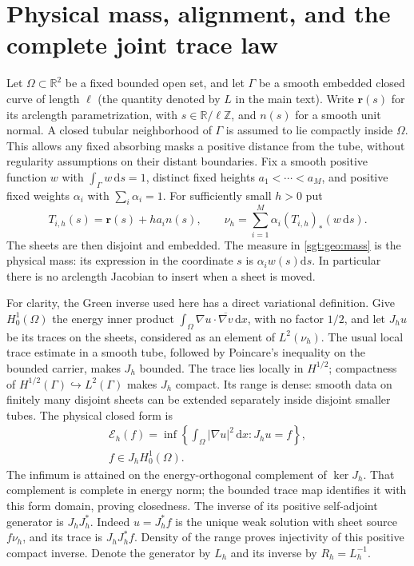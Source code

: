 \documentclass[aps,pra,reprint,superscriptaddress,longbibliography]{revtex4-2}
\newcommand{\dd}{\mathrm d}
\begin{document}
\section{Physical mass, alignment, and the complete joint trace law}
\label{sgt:geo:setup}
\label{sgt:geo:appendix}

Let $\Omega\subset\mathbb R^2$ be a fixed bounded open set, and let
$\Gamma$ be a smooth embedded closed curve of length $\ell$ (the
quantity denoted by $L$ in the main text).  Write
$\mathbf r(s)$ for its arclength parametrization, with
$s\in\mathbb R/\ell\mathbb Z$, and $n(s)$ for a smooth unit normal.
A closed tubular neighborhood of $\Gamma$ is assumed to lie compactly
inside $\Omega$.  This allows any fixed absorbing masks a positive
distance from the tube, without regularity assumptions on their
distant boundaries.  Fix a smooth positive function $w$ with
$\int_\Gamma w\,\dd s=1$, distinct fixed heights
$a_1<\cdots<a_M$, and positive fixed weights $\alpha_i$ with
$\sum_i\alpha_i=1$.  For sufficiently small $h>0$ put
\begin{equation}
 T_{i,h}(s)=\mathbf r(s)+ha_i n(s),\qquad
 \nu_h=\sum_{i=1}^M\alpha_i(T_{i,h})_*(w\,\dd s).
 \label{sgt:geo:mass}
\end{equation}
The sheets are then disjoint and embedded.  The measure in
\eqref{sgt:geo:mass} is the physical mass: its expression in the
coordinate $s$ is $\alpha_iw(s)\dd s$.  In particular there is no
arclength Jacobian to insert when a sheet is moved.

For clarity, the Green inverse used here has a direct variational
definition.  Give $H^1_0(\Omega)$ the energy inner product
$\int_\Omega\nabla u\cdot\overline{\nabla v}\,\dd x$, with no factor
$1/2$, and let $J_hu$ be its traces on the sheets, considered as an
element of $L^2(\nu_h)$.  The usual local trace estimate in a smooth
tube, followed by Poincare's inequality on the bounded carrier, makes
$J_h$ bounded.  The trace lies locally in $H^{1/2}$; compactness of
$H^{1/2}(\Gamma)\hookrightarrow L^2(\Gamma)$ makes $J_h$ compact.
Its range is dense: smooth data on finitely many disjoint sheets can
be extended separately inside disjoint smaller tubes.  The physical
closed form is
\[
\begin{gathered}
 \mathcal E_h(f)=\inf\left\{
   \int_\Omega|\nabla u|^2\,\dd x:J_hu=f\right\},
 \\
 f\in J_hH^1_0(\Omega).
\end{gathered}
\]
The infimum is attained on the energy-orthogonal complement of
$\ker J_h$.  That complement is complete in energy norm; the bounded
trace map identifies it with this form domain, proving closedness.
The inverse of its positive self-adjoint generator is $J_hJ_h^*$.
Indeed $u=J_h^*f$ is the unique weak solution with sheet source $f\nu_h$,
and its trace is $J_hJ_h^*f$.  Density of the range proves injectivity of
this positive compact inverse.  Denote the generator by $L_h$ and its
inverse by $R_h=L_h^{-1}$.
\end{document}
